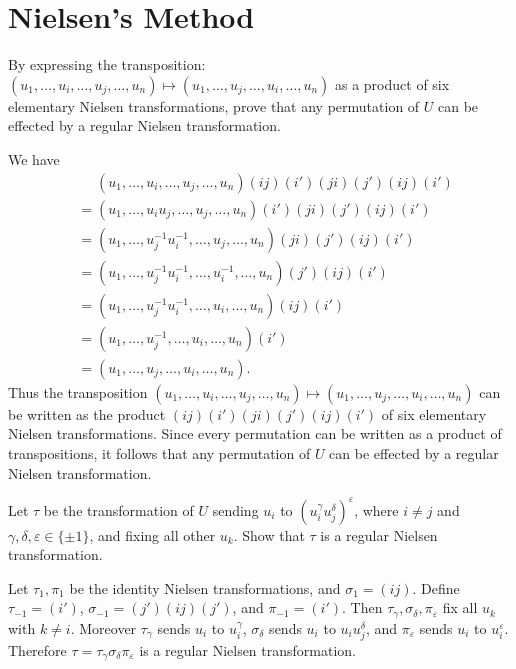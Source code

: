 \section{Nielsen's Method}
\begin{questions}
\question By expressing the transposition: $(u_1,\ldots,u_i,\ldots,u_j,\ldots,u_n)\mapsto(u_1,\ldots,u_j,\ldots,u_i,\ldots,u_n)$ as a product of six elementary Nielsen transformations, prove that any permutation of $U$ can be effected by a regular Nielsen transformation.
  \begin{solution}
    We have
    \begin{align*}
      & \phantom{{}={}} (u_1,\ldots,u_i,\ldots,u_j,\ldots,u_n)(ij)(i')(ji)(j')(ij)(i') \\
      &= (u_1,\ldots,u_iu_j,\ldots,u_j,\ldots,u_n)(i')(ji)(j')(ij)(i') \\
      &= (u_1,\ldots,u_j^{-1}u_i^{-1},\ldots,u_j,\ldots,u_n)(ji)(j')(ij)(i') \\
      &= (u_1,\ldots,u_j^{-1}u_i^{-1},\ldots,u_i^{-1},\ldots,u_n)(j')(ij)(i') \\
      &= (u_1,\ldots,u_j^{-1}u_i^{-1},\ldots,u_i,\ldots,u_n)(ij)(i') \\
      &= (u_1,\ldots,u_j^{-1},\ldots,u_i,\ldots,u_n)(i') \\
      &= (u_1,\ldots,u_j,\ldots,u_i,\ldots,u_n).
    \end{align*}
    Thus the transposition $(u_1,\ldots,u_i,\ldots,u_j,\ldots,u_n)\mapsto(u_1,\ldots,u_j,\ldots,u_i,\ldots,u_n)$ can be written as the product $(ij)(i')(ji)(j')(ij)(i')$ of six elementary Nielsen transformations. Since every permutation can be written as a product of transpositions, it follows that any permutation of $U$ can be effected by a regular Nielsen transformation.
  \end{solution}

\question Let $\tau$ be the transformation of $U$ sending $u_i$ to $(u_i^\gamma u_j^\delta)^\varepsilon$, where $i\neq j$ and $\gamma,\delta,\varepsilon\in\{\pm1\}$, and fixing all other $u_k$. Show that $\tau$ is a regular Nielsen transformation.
  \begin{solution}
    Let $\tau_1,\pi_1$ be the identity Nielsen transformations, and $\sigma_1=(ij)$. Define $\tau_{-1}=(i')$, $\sigma_{-1}=(j')(ij)(j')$, and $\pi_{-1}=(i')$. Then $\tau_\gamma,\sigma_\delta,\pi_\varepsilon$ fix all $u_k$ with $k\neq i$. Moreover $\tau_\gamma$ sends $u_i$ to $u_i^{\gamma}$, $\sigma_\delta$ sends $u_i$ to $u_iu_j^{\delta}$, and $\pi_\varepsilon$ sends $u_i$ to $u_i^{\varepsilon}$. Therefore $\tau=\tau_\gamma\sigma_\delta\pi_\varepsilon$ is a regular Nielsen transformation.
  \end{solution}


\end{questions}
